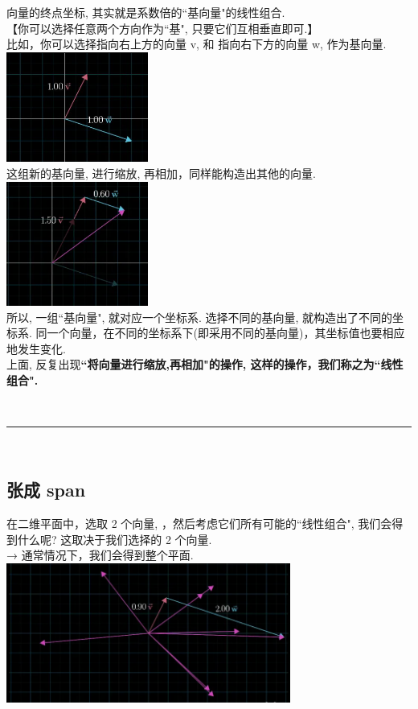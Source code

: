 \documentclass[UTF8]{ctexart}
\begin{document}
向量的终点坐标, 其实就是系数倍的``基向量"的线性组合.\\



【你可以选择任意两个方向作为``基", 只要它们互相垂直即可.】 \\
比如，你可以选择指向右上方的向量 v, 和 指向右下方的向量 w, 作为基向量. \\
\includegraphics[width=0.35\textwidth]{img/0102.png}\\

这组新的基向量, 进行缩放, 再相加，同样能构造出其他的向量.\\
\includegraphics[width=0.35\textwidth]{img/0103.png}\\

所以, 一组``基向量", 就对应一个坐标系. 选择不同的基向量, 就构造出了不同的坐标系. 同一个向量，在不同的坐标系下(即采用不同的基向量)，其坐标值也要相应地发生变化. \\

上面, 反复出现\textbf{``将向量进行缩放,再相加"的操作, 这样的操作，我们称之为``线性组合".}


~\\
\hrule
~\\

\subsection{张成 span}


在二维平面中，选取 2 个向量, ，然后考虑它们所有可能的``线性组合", 我们会得到什么呢? 这取决于我们选择的 2 个向量.\\

→ 通常情况下，我们会得到整个平面.\\
\includegraphics[width=0.7\textwidth]{img/0104.png}\\
\end{document}
